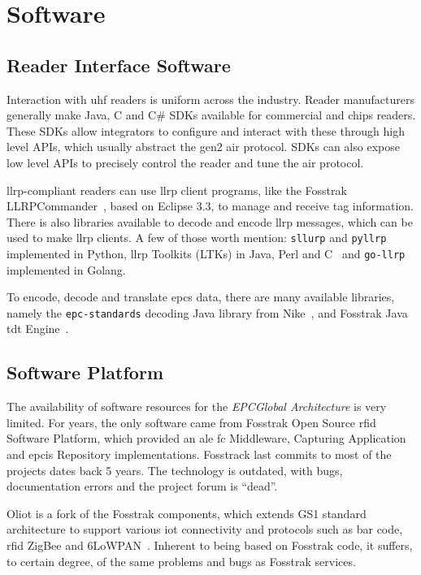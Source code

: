 \section{Software}

\subsection{Reader Interface Software}

Interaction with \ac{uhf} readers is uniform across the industry.
Reader manufacturers generally make Java, C\+\+ and C\# SDKs available for commercial and chips readers. These SDKs allow integrators to configure and interact with these through high level APIs, which usually abstract the \ac{gen2} air protocol. SDKs can also expose low level APIs to precisely control the reader and tune the air protocol.

\ac{llrp}-compliant readers can use \ac{llrp} client programs, like the Fosstrak LLRPCommander~\cite{FosstrakLLRPCommander}, based on Eclipse 3.3, to manage and receive tag information. 
There is also libraries available to decode and encode \ac{llrp} messages, which can be used to make \ac{llrp} clients. A few of those worth mention: \texttt{sllurp} and \texttt{pyllrp} implemented in Python, \ac{llrp} Toolkits (LTKs) in Java, Perl and C\+\+~\cite{LlrpOrga} and \texttt{go-llrp} implemented in Golang.

To encode, decode and translate \acp{epc} data, there are many available libraries, namely the \texttt{epc-standards} decoding Java library from Nike~\cite{NikeIncEpcstandards2019}, and Fosstrak Java \ac{tdt} Engine~\cite{FosstrakTagData}.

\subsection{Software Platform}

The availability of software resources for the \emph{EPCGlobal Architecture} is very limited.
For years, the only software came from Fosstrak Open Source \ac{rfid} Software Platform, which provided an \ac{ale} \ac{fc} Middleware, Capturing Application and \ac{epcis} Repository implementations. Fosstrack last commits to most of the projects dates back 5 years. The technology is outdated, with bugs, documentation errors and the project forum is ``dead''.

Oliot is a fork of the Fosstrak components, which extends GS1 standard architecture to support various \ac{iot} connectivity and protocols such as bar code, \ac{rfid} ZigBee and 6LoWPAN~\cite{OpenLanguageInternet}. Inherent to being based on Fosstrak code, it suffers, to certain degree, of the same problems and bugs as Fosstrak services.

